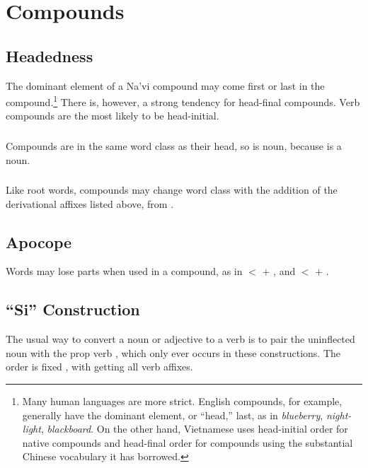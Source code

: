 \section{Compounds}

\subsection{Headedness} The dominant element of a Na'vi compound may
come first or last in the compound.\footnote{Many human languages are
more strict.  English compounds, for example, generally have the
dominant element, or ``head,'' last, as in \textit{blueberry},
\textit{night-light}, \textit{blackboard}.  On the other hand,
Vietnamese uses head-initial order for native compounds and
head-final order for compounds using the substantial Chinese
vocabulary it has borrowed.}  There is, however, a strong tendency
for head-final compounds.  Verb compounds are the most likely to be
head-initial.

\subsubsection{} Compounds are in the same word class as their head,
so   is noun, because   is a
noun.

\subsubsection{} Like root words, compounds may change word class with
the addition of the derivational affixes listed above,
  from  .


\subsection{Apocope} Words may lose parts when used in a compound, as
in   $<$   $+$
 , and   $<$
  $+$  .


\subsection{``Si'' Construction} The usual way to convert a noun or
adjective to a verb is to pair the uninflected noun with the prop verb
, which only ever occurs in these constructions.  The order is
fixed , with  getting all verb affixes.\label{lingop:si-const}

